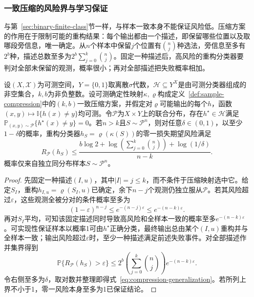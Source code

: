 \subsubsection{一致压缩的风险界与学习保证}

与第~\ref{sec:binary-finite-class}节一样，与样本一致本身不能保证风险低。压缩方案的作用在于限制可能的重构结果：每个输出都由一个描述，即保留哪些位置以及取哪段旁信息，唯一确定。从$n$个样本中保留$j$个位置有$\binom nj$种选法，旁信息至多有$2^b$种，描述总数至多为$2^b\sum_{j=0}^k\binom nj$。固定一种描述后，高风险的重构分类器要判对全部未保留的观测，概率很小；再对全部描述把失败概率相加。

\begin{theorem}[一致样本压缩的期望风险上界]
\label{thm:sample-compression-bound}
设$(X,\mathcal X)$为可测空间，$Y=\{0,1\}$取离散$\sigma$代数，$\mathcal H\subseteq Y^X$是由可测分类器组成的非空集合，$k,b$为非负整数。设可测确定性映射$\kappa,\varrho$构成定义~\ref{def:sample-compression}中的$(k,b)$一致压缩方案，并假定对$\varrho$可能输出的每个$h$，函数$(x,y)\mapsto\mathbb I\{h(x)\neq y\}$均可测。令$\mathcal P$为$X\times Y$上的联合分布，存在$h^\star\in\mathcal H$满足$\mathbb P_{(x,y)\sim\mathcal P}\{h^\star(x)\neq y\}=0$。若$n>k$且$S\sim\mathcal P^n$，则对任意$\delta\in(0,1)$，以至少$1-\delta$的概率，重构分类器$h_S=\varrho(\kappa(S))$的零一损失期望风险满足
\begin{equation}
 R_{\mathcal P}(h_S)
 \leq\frac{b\log2+\log\!\left(\sum_{j=0}^k\binom nj\right)+\log(1/\delta)}{n-k}.
 \label{eq:compression-generalization}
\end{equation}
概率仅来自独立同分布样本$S\sim\mathcal P^n$。
\end{theorem}

\begin{proof}
先固定一种描述$(I,u)$，其中$|I|=j\leq k$，而不条件于压缩映射选中它。给定$S_I$，重构$h_{I,u}=\varrho(S_I,u)$已确定，余下$n-j$个观测仍独立服从$\mathcal P$。若其风险超过$\varepsilon$，这些观测全被分对的条件概率至多为
\[
 (1-\varepsilon)^{n-j}\leq e^{-(n-j)\varepsilon}\leq e^{-(n-k)\varepsilon}.
\]
再对$S_I$平均，可知该固定描述同时导致高风险和全样本一致的概率至多$e^{-(n-k)\varepsilon}$。可实现性保证样本以概率1可由$h^\star$正确分类，最终输出总由某个$(I,u)$重构并与全样本一致；输出风险超过$\varepsilon$时，至少一种描述满足前述失败事件。对全部描述作并集界得到
\[
 \mathbb P\{R_{\mathcal P}(h_S)>\varepsilon\}
 \leq 2^b\left(\sum_{j=0}^k\binom nj\right)e^{-(n-k)\varepsilon}.
\]
令右侧至多为$\delta$，取对数并整理即得式~\eqref{eq:compression-generalization}。若所列上界不小于1，零一风险本身至多为1已保证结论。
\end{proof}

